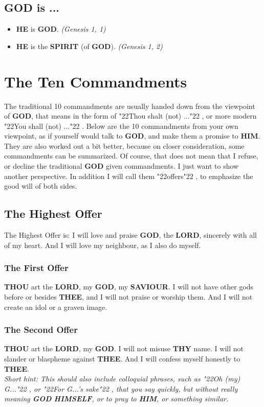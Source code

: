 \documentclass[12pt,a4paper]{article}
\newcommand{\God}[0]{\textbf{GOD}}
\newcommand{\He}[0]{\textbf{HE}}
\newcommand{\Him}[0]{\textbf{HIM}}
\newcommand{\Himself}[0]{\textbf{HIMSELF}}
\newcommand{\Lord}[0]{\textbf{LORD}}
\newcommand{\Saviour}[0]{\textbf{SAVIOUR}}
\newcommand{\Spirit}[0]{\textbf{SPIRIT}}
\newcommand{\Thee}[0]{\textbf{THEE}}
\newcommand{\Thou}[0]{\textbf{THOU}}
\newcommand{\Thy}[0]{\textbf{THY}}
\newcommand{\q}[1]{\char"22{#1}\char"22 }
\begin{document}
	\subsection{{\God} is ...}
		\begin{itemize}[nosep]
			\item {\He} is {\God}. \textit{(Genesis 1, 1)}
			\item {\He} is the {\Spirit} (of {\God}). \textit{(Genesis 1, 2)}
		\end{itemize}

	\newpage
	\section{The Ten Commandments}
		The traditional 10 commandments are usually handed down from the viewpoint of {\God},
		that means in the form of \q{Thou shalt (not) ...},
		or more modern \q{You shall (not) ...}.
		Below are the 10 commandments from your own viewpoint,
		as if yourself would talk to {\God},
		and make them a promise to {\Him}.
		They are also worked out a bit better,
		because on closer consideration,
		some commandments can be summarized.
		Of course,
		that does not mean that I refuse,
		or decline the traditional {\God} given commandments.
		I just want to show another perspective.
		In addition I will call them \q{offers},
		to emphasize the good will of both sides.
	
	\subsection{The Highest Offer}
		The Highest Offer is:
		I will love and praise {\God},
		the {\Lord},
		sincerely with all of my heart.
		And I will love my neighbour,
		as I also do myself.
		
	\subsubsection{The First Offer}
		{\Thou} art the {\Lord},
		my {\God},
		my {\Saviour}.
		I will not have other gods before or besides {\Thee},
		and I will not praise or worship them.
		And I will not create an idol or a graven image.
		
	\subsubsection{The Second Offer}
		{\Thou} art the {\Lord},
		my {\God}.
		I will not misuse {\Thy} name.
		I will not slander or blaspheme against {\Thee}.
		And I will confess myself honestly to {\Thee}.
		\\
		\textit{Short hint:
		This should also include colloquial phrases,
		such as \q{Oh (my) G...},
		or \q{For G...'s sake},
		that you say quickly,
		but without really meaning {\God} {\Himself},
		or to pray to {\Him},
		or something similar.}
			
\end{document}
